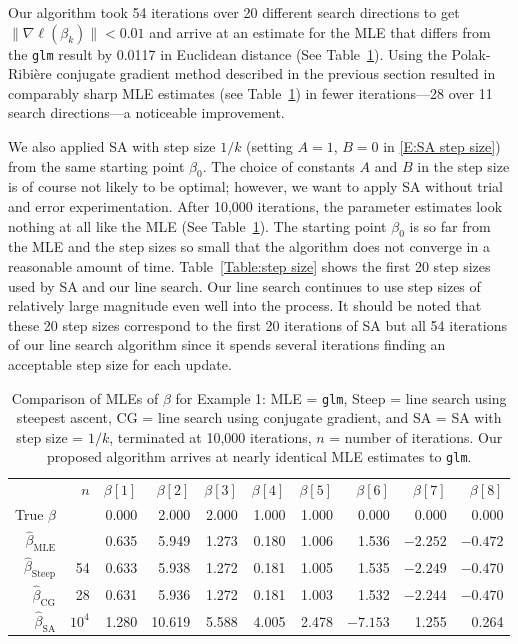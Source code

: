 Our algorithm took 54 iterations over 20 different search directions to get $\lVert 
\nabla \ell( \beta_k ) \rVert < 
0.01$ and arrive at an estimate for the MLE that differs from the \texttt{glm} result 
by 0.0117 in Euclidean distance 
(See Table~\ref{Table:Logistic}).  
Using the Polak-Ribi\`{e}re conjugate gradient method described in the previous 
section  resulted in comparably sharp 
MLE estimates (see Table~\ref{Table:Logistic}) in fewer iterations---28 over 11 search 
directions---a noticeable 
improvement. 

We also applied  SA with step size $1/k$ (setting $A=1$, $B=0$ in \eqref{E:SA step 
size}) from the same starting point 
$\beta_0$.  The choice of constants $A$ and $B$ in the step size is of course not 
likely to be optimal;
however, we want to apply SA without trial and error experimentation.  
After 10,000 iterations, the parameter estimates look nothing at all like the MLE (See 
Table~\ref{Table:Logistic}).  
The starting point $\beta_0$ is so far from the MLE and the step sizes so small that 
the algorithm does not converge in a reasonable amount of time.
Table~\ref{Table:step size} shows the first 20 step sizes used by SA and our line 
search. Our line search continues to 
use step sizes of relatively large magnitude even well into the process.  It should be 
noted that these 20 step sizes 
correspond to the first 20 iterations of SA but all 54 iterations of our line search 
algorithm since it spends several 
iterations finding an acceptable step size for each update.


\begin{table}
\caption[Comparison of MLEs of $\beta$ for Example 1]{Comparison of MLEs of $\beta$ for Example 1: MLE = \texttt{glm}, Steep = line 
search using steepest ascent, 
CG = line search using conjugate gradient, and SA =  SA with step size = $1/k$, 
terminated at 10,000 iterations,
$n$ = number of iterations.  Our 
proposed algorithm arrives at nearly identical MLE estimates to \texttt{glm}.}
\begin{center}
\begin{tabular}{rrrrrrrrrr}
  \hline
 & $n$ & $\beta[1]$ & $\beta[2]$ & $\beta[3]$ & $\beta[4]$ & $\beta[5]$ & $\beta[6]$ & 
$\beta[7]$ & $\beta[8]$ \\ 
True $\beta$ & & 0.000 & 2.000 & 2.000 & 1.000 & 1.000 & 0.000 & 0.000 & 0.000 \\ 
  $\hat{\beta}_{\textrm{MLE}}$ & & 0.635 & 5.949 & 1.273 & 0.180 & 1.006 & 1.536 & 
$-2.252$ & $-0.472$ \\ 
  $\hat{\beta}_{\textrm{Steep}}$ & 54 & 0.633 & 5.938 & 1.272 & 0.181 & 1.005 & 1.535 
& $-2.249$ & $-0.470$ \\ 
  $\hat{\beta}_{\textrm{CG}}$ & 28 & 0.631 & 5.936 & 1.272 & 0.181 & 1.003 & 1.532 & 
$-2.244$ & $-0.470$ \\    
  $\hat{\beta}_{\textrm{SA}}$ & $10^4$ & 1.280 & 10.619 & 5.588 & 4.005 & 2.478 & 
$-7.153$ & 1.255 & 0.264 \\ 
  \hline
\end{tabular}
\end{center}
\label{Table:Logistic}
\end{table}

